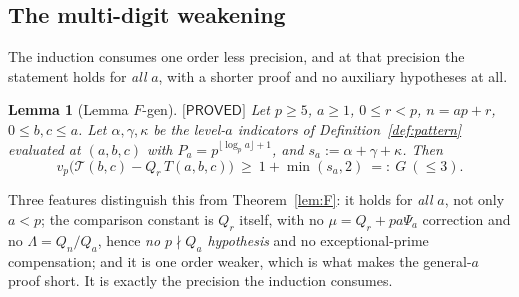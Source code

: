 \documentclass[11pt,reqno]{amsart}
\theoremstyle{plain}
\newtheorem{lemma}[theorem]{Lemma}
\theoremstyle{definition}
\theoremstyle{remark}
\numberwithin{equation}{section}
\newcommand{\Tcal}{\mathcal{T}}
\newcommand{\PROVED}{\textsf{[PROVED]}}
\begin{document}
\subsection{The multi-digit weakening}

The induction consumes one order less precision, and at that precision the statement holds for
\emph{all} $a$, with a shorter proof and no auxiliary hypotheses at all.

\begin{lemma}[Lemma $F$-gen]\label{lem:Fgen}
$\PROVED$ Let $p\ge5$, $a\ge1$, $0\le r<p$, $n=ap+r$, $0\le b,c\le a$. Let $\alpha,\gamma,\kappa$
be the level-$a$ indicators of Definition~\textup{\ref{def:pattern}} evaluated at $(a,b,c)$ with
$P_a=p^{\lfloor\log_pa\rfloor+1}$, and $s_a:=\alpha+\gamma+\kappa$. Then
\[
v_p\bigl(\Tcal(b,c)-Q_r\,T(a,b,c)\bigr)\ \ge\ 1+\min(s_a,2)\ =:\ G\ (\le3).
\]
\end{lemma}

Three features distinguish this from Theorem~\ref{lem:F}: it holds for \emph{all} $a$, not only
$a<p$; the comparison constant is $Q_r$ itself, with no $\mu=Q_r+pa\Psi_a$ correction and no
$\Lambda=Q_n/Q_a$, hence \emph{no $p\nmid Q_a$ hypothesis} and no exceptional-prime
compensation; and it is one order weaker, which is what makes the general-$a$ proof short. It
is exactly the precision the induction consumes.
\end{document}

